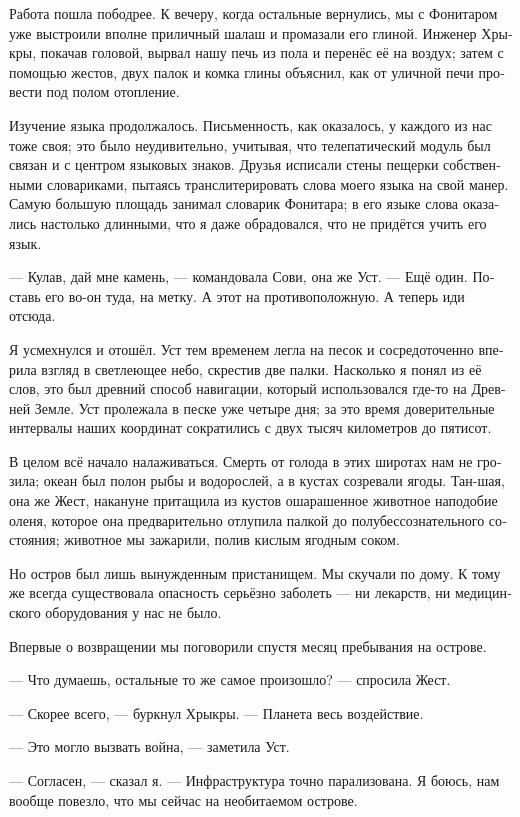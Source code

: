 \documentclass[a4paper,12pt,fleqn]{book}\usepackage{polyglossia}\setdefaultlanguage[babelshorthands=true]{russian}\setotherlanguage{english}\defaultfontfeatures{Ligatures=TeX,Mapping=tex-text}
\newcommand{\asterism}{\vspace{1em}{\centering\Large\bfseries$\ast~\ast~\ast$\par}\vspace{1em}}
\begin{document}
Работа пошла пободрее.
К вечеру, когда остальные вернулись, мы с Фонитаром уже выстроили вполне приличный шалаш и промазали его глиной.
Инженер Хрыкры, покачав головой, вырвал нашу печь из пола и перенёс её на воздух;
затем с помощью жестов, двух палок и комка глины объяснил, как от уличной печи провести под полом отопление.

Изучение языка продолжалось.
Письменность, как оказалось, у каждого из нас тоже своя;
это было неудивительно, учитывая, что телепатический модуль был связан и с центром языковых знаков.
Друзья исписали стены пещерки собственными словариками, пытаясь транслитерировать слова моего языка на свой манер.
Самую большую площадь занимал словарик Фонитара;
в его языке слова оказались настолько длинными, что я даже обрадовался, что не придётся учить его язык.

\asterism

--- Кулав, дай мне камень, --- командовала Сови, она же Уст.
--- Ещё один.
Поставь его во-он туда, на метку.
А этот на противоположную.
А теперь иди отсюда.

Я усмехнулся и отошёл.
Уст тем временем легла на песок и сосредоточенно вперила взгляд в светлеющее небо, скрестив две палки.
Насколько я понял из её слов, это был древний способ навигации, который использовался где-то на Древней Земле.
Уст пролежала в песке уже четыре дня;
за это время доверительные интервалы наших координат сократились с двух тысяч километров до пятисот.

В целом всё начало налаживаться.
Смерть от голода в этих широтах нам не грозила;
океан был полон рыбы и водорослей, а в кустах созревали ягоды.
Тан-шая, она же Жест, накануне притащила из кустов ошарашенное животное наподобие оленя, которое она предварительно отлупила палкой до полубессознательного состояния;
животное мы зажарили, полив кислым ягодным соком.

Но остров был лишь вынужденным пристанищем.
Мы скучали по дому.
К тому же всегда существовала опасность серьёзно заболеть --- ни лекарств, ни медицинского оборудования у нас не было.

Впервые о возвращении мы поговорили спустя месяц пребывания на острове.

--- Что думаешь, остальные то же самое произошло? --- спросила Жест.

--- Скорее всего, --- буркнул Хрыкры.
--- Планета весь воздействие.

--- Это могло вызвать война, --- заметила Уст.

--- Согласен, --- сказал я.
--- Инфраструктура точно парализована.
Я боюсь, нам вообще повезло, что мы сейчас на необитаемом острове.
\end{document}
